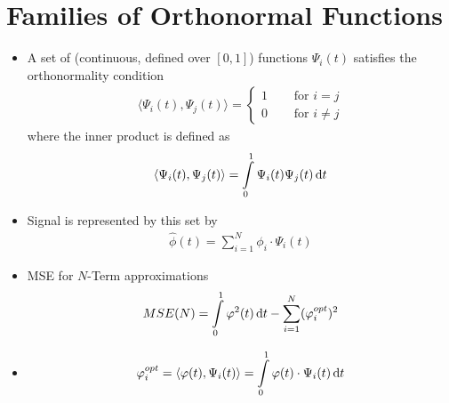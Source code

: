 \section{Families of Orthonormal Functions}
\begin{itemize}
	\item
		A set of (continuous, defined over $[0,1]$) functions $\Psi_i(t)$ satisfies the orthonormality condition
		\begin{align*}
			\langle\Psi_i(t), \Psi_j(t)\rangle = \begin{cases}
				1 \quad& \text{ for $i = j$}\\
				0 \quad& \text{ for $i\neq j$}
			\end{cases}
		\end{align*}
		where the inner product is defined as 
		\begin{align*}
			\langle\Psi_i(t), \Psi_j(t)\rangle = \intop_0^1 \Psi_i(t) \Psi_j(t) \id t
		\end{align*}
	\item
		Signal is represented by this set  by
		\begin{align*}
			\widehat\phi(t) = \sum_{i=1}^N \phi_i \cdot \Psi_i(t)
		\end{align*}
	\item
		MSE for $N$-Term approximations
		\begin{align*}
			MSE(N) = \intop_0^1 \phi^2(t) \id t - \sum_{i=1}^N (\phi_i^{opt})^2
		\end{align*}
	\item
		\begin{align*}
			\phi_i^{opt} = \langle\phi(t), \Psi_i(t)\rangle = \intop_0^1 \phi(t) \cdot \Psi_i(t) \id t
		\end{align*}
		
\end{itemize}

